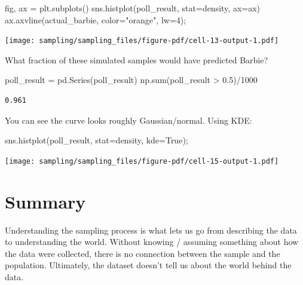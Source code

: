 \documentclass[
  letterpaper,
  DIV=11,
  numbers=noendperiod]{scrreprt}
\newenvironment{Shaded}{\begin{snugshade}}{\end{snugshade}}
\newcommand{\BuiltInTok}[1]{\textcolor[rgb]{0.00,0.23,0.31}{#1}}
\newcommand{\DecValTok}[1]{\textcolor[rgb]{0.68,0.00,0.00}{#1}}
\newcommand{\FloatTok}[1]{\textcolor[rgb]{0.68,0.00,0.00}{#1}}
\newcommand{\NormalTok}[1]{\textcolor[rgb]{0.00,0.23,0.31}{#1}}
\newcommand{\OperatorTok}[1]{\textcolor[rgb]{0.37,0.37,0.37}{#1}}
\newcommand{\StringTok}[1]{\textcolor[rgb]{0.13,0.47,0.30}{#1}}
\newcommand{\VariableTok}[1]{\textcolor[rgb]{0.07,0.07,0.07}{#1}}
\begin{document}
\begin{Shaded}
\begin{Highlighting}[]
\NormalTok{fig, ax }\OperatorTok{=}\NormalTok{ plt.subplots()}
\NormalTok{sns.histplot(poll\_result, stat}\OperatorTok{=}\StringTok{\textquotesingle{}density\textquotesingle{}}\NormalTok{, ax}\OperatorTok{=}\NormalTok{ax)}
\NormalTok{ax.axvline(actual\_barbie, color}\OperatorTok{=}\StringTok{"orange"}\NormalTok{, lw}\OperatorTok{=}\DecValTok{4}\NormalTok{)}\OperatorTok{;}
\end{Highlighting}
\end{Shaded}

\texttt{[image: sampling/sampling\_files/figure-pdf/cell-13-output-1.pdf]}

What fraction of these simulated samples would have predicted Barbie?

\begin{Shaded}
\begin{Highlighting}[]
\NormalTok{poll\_result }\OperatorTok{=}\NormalTok{ pd.Series(poll\_result)}
\NormalTok{np.}\BuiltInTok{sum}\NormalTok{(poll\_result }\OperatorTok{\textgreater{}} \FloatTok{0.5}\NormalTok{)}\OperatorTok{/}\DecValTok{1000}
\end{Highlighting}
\end{Shaded}

\begin{verbatim}
0.961
\end{verbatim}

You can see the curve looks roughly Gaussian/normal. Using KDE:

\begin{Shaded}
\begin{Highlighting}[]
\NormalTok{sns.histplot(poll\_result, stat}\OperatorTok{=}\StringTok{\textquotesingle{}density\textquotesingle{}}\NormalTok{, kde}\OperatorTok{=}\VariableTok{True}\NormalTok{)}\OperatorTok{;}
\end{Highlighting}
\end{Shaded}

\texttt{[image: sampling/sampling\_files/figure-pdf/cell-15-output-1.pdf]}

\section{Summary}\label{summary-1}

Understanding the sampling process is what lets us go from describing
the data to understanding the world. Without knowing / assuming
something about how the data were collected, there is no connection
between the sample and the population. Ultimately, the dataset doesn't
tell us about the world behind the data.
\end{document}
